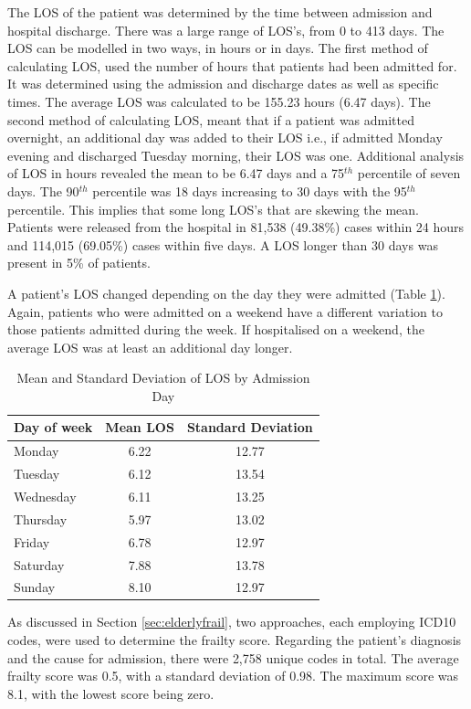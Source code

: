 \documentclass[../thesis.tex]{subfiles}
\begin{document}
The LOS of the patient was determined by the time between admission and hospital discharge. There was a large range of LOS's, from 0 to 413 days. The LOS can be modelled in two ways, in hours or in days. The first method of calculating LOS, used the number of hours that patients had been admitted for. It was determined using the admission and discharge dates as well as specific times. The average LOS was calculated to be 155.23 hours (6.47 days). The second method of calculating LOS, meant that if a patient was admitted overnight, an additional day was added to their LOS i.e., if admitted Monday evening and discharged Tuesday morning, their LOS was one. Additional analysis of LOS in hours revealed the mean to be 6.47 days and a 75$^{th}$ percentile of seven days. The 90$^{th}$ percentile was 18 days increasing to 30 days with the 95$^{th}$ percentile. This implies that some long LOS's that are skewing the mean. Patients were released from the hospital in 81,538 (49.38\%) cases within 24 hours and 114,015 (69.05\%) cases within five days. A LOS longer than 30 days was present in 5\% of patients.

A patient's LOS changed depending on the day they were admitted (Table \ref{tab:DayLOS}). Again, patients who were admitted on a weekend have a different variation to those patients admitted during the week. If hospitalised on a weekend, the average LOS was at least an additional day longer.

\begin{table}[h!]
    \centering
    \begin{tabular}{lcc}\toprule
    \textbf{Day of week} & \textbf{Mean LOS} & \textbf{Standard Deviation}\\    \midrule
    Monday & 6.22 & 12.77\\
    Tuesday & 6.12 & 13.54\\
    Wednesday &6.11 &13.25\\
    Thursday &5.97 & 13.02\\
    Friday &6.78  &12.97\\
    Saturday & 7.88 & 13.78\\
    Sunday & 8.10  &12.97\\ \bottomrule
    \end{tabular}
    \caption{Mean and Standard Deviation of LOS by Admission Day}
    \label{tab:DayLOS}
\end{table}

As discussed in Section \ref{sec:elderlyfrail}, two approaches, each employing ICD10 codes, were used to determine the frailty score. Regarding the patient's diagnosis and the cause for admission, there were 2,758 unique codes in total. The average frailty score was 0.5, with a standard deviation of 0.98. The maximum score was 8.1, with the lowest score being zero.
\end{document}
